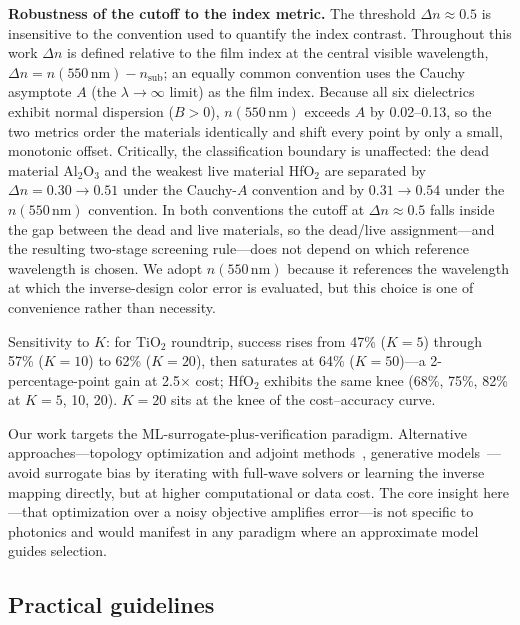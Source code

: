 \documentclass[10pt,twocolumn]{article}
\begin{document}
\textbf{Robustness of the cutoff to the index metric.} The threshold $\Delta n \approx 0.5$ is insensitive to the convention used to quantify the index contrast. Throughout this work $\Delta n$ is defined relative to the film index at the central visible wavelength, $\Delta n = n(550\,\mathrm{nm}) - n_{\mathrm{sub}}$; an equally common convention uses the Cauchy asymptote $A$ (the $\lambda\to\infty$ limit) as the film index. Because all six dielectrics exhibit normal dispersion ($B>0$), $n(550\,\mathrm{nm})$ exceeds $A$ by 0.02--0.13, so the two metrics order the materials identically and shift every point by only a small, monotonic offset. Critically, the classification boundary is unaffected: the dead material Al$_2$O$_3$ and the weakest live material HfO$_2$ are separated by $\Delta n = 0.30 \to 0.51$ under the Cauchy-$A$ convention and by $0.31 \to 0.54$ under the $n(550\,\mathrm{nm})$ convention. In both conventions the cutoff at $\Delta n \approx 0.5$ falls inside the gap between the dead and live materials, so the dead/live assignment---and the resulting two-stage screening rule---does not depend on which reference wavelength is chosen. We adopt $n(550\,\mathrm{nm})$ because it references the wavelength at which the inverse-design color error is evaluated, but this choice is one of convenience rather than necessity.

Sensitivity to $K$: for TiO$_2$ roundtrip, success rises from 47\% ($K = 5$) through 57\% ($K = 10$) to 62\% ($K = 20$), then saturates at 64\% ($K = 50$)---a 2-percentage-point gain at 2.5$\times$ cost; HfO$_2$ exhibits the same knee (68\%, 75\%, 82\% at $K = 5$, 10, 20). $K = 20$ sits at the knee of the cost--accuracy curve.

Our work targets the ML-surrogate-plus-verification paradigm. Alternative approaches---topology optimization and adjoint methods~\cite{ref25,ref26}, generative models~\cite{ref27}---avoid surrogate bias by iterating with full-wave solvers or learning the inverse mapping directly, but at higher computational or data cost. The core insight here---that optimization over a noisy objective amplifies error---is not specific to photonics and would manifest in any paradigm where an approximate model guides selection.

\subsection{Practical guidelines}
\end{document}
